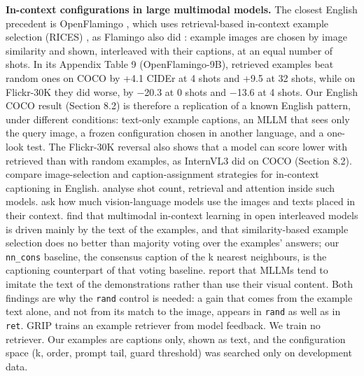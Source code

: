 \documentclass[manuscript,screen]{acmart}
\begin{document}
\textbf{In-context configurations in large multimodal models.} The closest English precedent is
OpenFlamingo \citep{Awadalla2023OpenFlamingo}, which uses retrieval-based in-context example
selection (RICES) \citep{Yang2022PICa}, as Flamingo also did \citep{Alayrac2022Flamingo}: example
images are chosen by image similarity and shown, interleaved with their captions, at an equal number
of shots. In its Appendix Table 9 (OpenFlamingo-9B), retrieved examples beat random ones on COCO by
+4.1 CIDEr at 4 shots and +9.5 at 32 shots, while on Flickr-30K they did worse, by −20.3 at 0 shots
and −13.6 at 4 shots. Our English COCO result (Section 8.2) is therefore a replication of a known
English pattern, under different conditions: text-only example captions, an MLLM that sees only the
query image, a frozen configuration chosen in another language, and a one-look test. The Flickr-30K
reversal also shows that a model can score lower with retrieved than with random examples, as
InternVL3 did on COCO (Section 8.2). \citet{Yang2023ICLConfig} compare image-selection and
caption-assignment strategies for in-context captioning in English. \citet{Li2025UnveilingICL}
analyse shot count, retrieval and attention inside such models. \citet{dosSantos2025ContextVLM} ask
how much vision-language models use the images and texts placed in their context.
\citet{Baldassini2024MICL} find that multimodal in-context learning in open interleaved models is
driven mainly by the text of the examples, and that similarity-based example selection does no
better than majority voting over the examples' answers; our \texttt{nn\_cons} baseline, the
consensus caption of the k nearest neighbours, is the captioning counterpart of that voting
baseline. \citet{Chen2025TrueMICL} report that MLLMs tend to imitate the text of the demonstrations
rather than use their visual content. Both findings are why the \texttt{rand} control is needed: a
gain that comes from the example text alone, and not from its match to the image, appears in
\texttt{rand} as well as in \texttt{ret}. GRIP \citep{Allabadi2026GRIP} trains an example retriever
from model feedback. We train no retriever. Our examples are captions only, shown as text, and the
configuration space (k, order, prompt tail, guard threshold) was searched only on development data.
\end{document}
